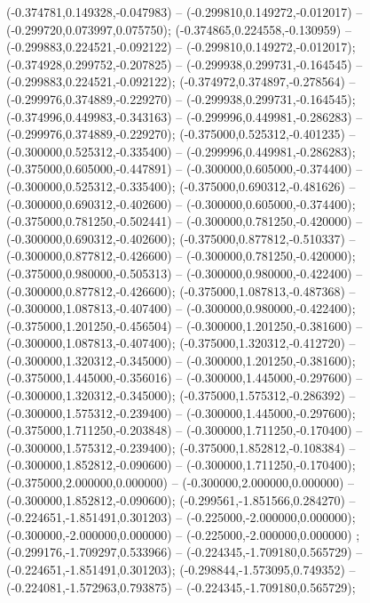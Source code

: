  (-0.374781,0.149328,-0.047983) -- (-0.299810,0.149272,-0.012017) -- (-0.299720,0.073997,0.075750);
 (-0.374865,0.224558,-0.130959) -- (-0.299883,0.224521,-0.092122) -- (-0.299810,0.149272,-0.012017);
 (-0.374928,0.299752,-0.207825) -- (-0.299938,0.299731,-0.164545) -- (-0.299883,0.224521,-0.092122);
 (-0.374972,0.374897,-0.278564) -- (-0.299976,0.374889,-0.229270) -- (-0.299938,0.299731,-0.164545);
 (-0.374996,0.449983,-0.343163) -- (-0.299996,0.449981,-0.286283) -- (-0.299976,0.374889,-0.229270);
 (-0.375000,0.525312,-0.401235) -- (-0.300000,0.525312,-0.335400) -- (-0.299996,0.449981,-0.286283);
 (-0.375000,0.605000,-0.447891) -- (-0.300000,0.605000,-0.374400) -- (-0.300000,0.525312,-0.335400);
 (-0.375000,0.690312,-0.481626) -- (-0.300000,0.690312,-0.402600) -- (-0.300000,0.605000,-0.374400);
 (-0.375000,0.781250,-0.502441) -- (-0.300000,0.781250,-0.420000) -- (-0.300000,0.690312,-0.402600);
 (-0.375000,0.877812,-0.510337) -- (-0.300000,0.877812,-0.426600) -- (-0.300000,0.781250,-0.420000);
 (-0.375000,0.980000,-0.505313) -- (-0.300000,0.980000,-0.422400) -- (-0.300000,0.877812,-0.426600);
 (-0.375000,1.087813,-0.487368) -- (-0.300000,1.087813,-0.407400) -- (-0.300000,0.980000,-0.422400);
 (-0.375000,1.201250,-0.456504) -- (-0.300000,1.201250,-0.381600) -- (-0.300000,1.087813,-0.407400);
 (-0.375000,1.320312,-0.412720) -- (-0.300000,1.320312,-0.345000) -- (-0.300000,1.201250,-0.381600);
 (-0.375000,1.445000,-0.356016) -- (-0.300000,1.445000,-0.297600) -- (-0.300000,1.320312,-0.345000);
 (-0.375000,1.575312,-0.286392) -- (-0.300000,1.575312,-0.239400) -- (-0.300000,1.445000,-0.297600);
 (-0.375000,1.711250,-0.203848) -- (-0.300000,1.711250,-0.170400) -- (-0.300000,1.575312,-0.239400);
 (-0.375000,1.852812,-0.108384) -- (-0.300000,1.852812,-0.090600) -- (-0.300000,1.711250,-0.170400);
 (-0.375000,2.000000,0.000000) -- (-0.300000,2.000000,0.000000) -- (-0.300000,1.852812,-0.090600);
 (-0.299561,-1.851566,0.284270) -- (-0.224651,-1.851491,0.301203) -- (-0.225000,-2.000000,0.000000);
 (-0.300000,-2.000000,0.000000) -- (-0.225000,-2.000000,0.000000) ;
 (-0.299176,-1.709297,0.533966) -- (-0.224345,-1.709180,0.565729) -- (-0.224651,-1.851491,0.301203);
 (-0.298844,-1.573095,0.749352) -- (-0.224081,-1.572963,0.793875) -- (-0.224345,-1.709180,0.565729);

